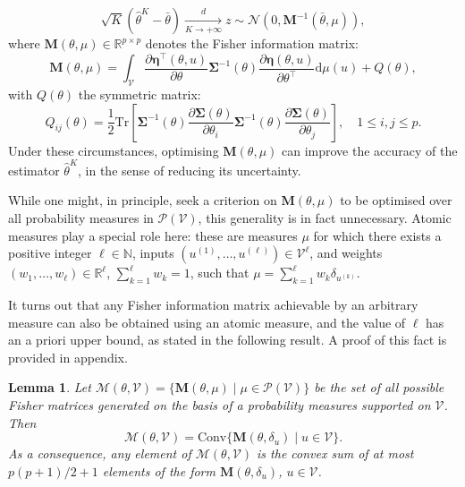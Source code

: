 \documentclass[twocolumn]{autart}
\newcommand{\B}[1]{{\textcolor{blue}{[bruno: \textit{#1}]}}}
\newtheorem{lemma}[theorem]{Lemma}
\theoremstyle{definition}
\theoremstyle{remark}
\newcommand{\R}{\mathbb{R}}
\newcommand{\N}{\mathbb{N}}
\newcommand{\diff}{\mathrm{d}}
\newcommand{\Conv}{\mathrm{Conv}}
\newcommand{\Tr}{\mathrm{Tr}}
\newcommand{\V}{\mathcal{V}}
\renewcommand{\P}{\mathcal{P}}
\newcommand{\Jb}{\mathbf{J}}
\newcommand{\Mb}{\mathbf{M}}
\newcommand{\etab}{\boldsymbol{\eta}}
\newcommand{\Sigmab}{\boldsymbol{\Sigma}}
\begin{document}
\begin{equation}\label{E:TCL}
\sqrt{K} (\widehat\theta^K-\bar\theta) \xrightarrow[K\to +\infty]{d} z \sim \mathcal{N}\left(0,\Mb^{-1}(\bar\theta,\mu)\right),
\end{equation}
where $\Mb(\theta,\mu)\in \R^{p\times p}$ denotes the Fisher information matrix:
\begin{equation}\label{E:defM}
\Mb(\theta,\mu) = 
\int_\V \frac{\partial\etab^\top(\theta,u)}{\partial\theta}
\Sigmab^{-1}(\theta) \frac{\partial\etab(\theta,u)}{\partial\theta^\top}  \diff \mu(u)+Q(\theta),
\end{equation}
with $Q(\theta)$ the symmetric matrix:
\begin{equation}\label{E:defQ}
Q_{ij}(\theta) = \frac{1}{2} \Tr\left[\Sigmab^{-1}(\theta)\frac{\partial\Sigmab(\theta)}{\partial\theta_i}\Sigmab^{-1}(\theta)\frac{\partial\Sigmab(\theta)}{\partial\theta_j}\right], \quad 1\leq i,j\leq p.
\end{equation}
Under these circumstances, optimising $\Mb(\theta,\mu)$ can improve the accuracy of the estimator $\widehat\theta^K$, in the sense of reducing its uncertainty.

While one might, in principle, seek a criterion on $\Mb(\theta,\mu)$ to be optimised over all probability measures in $\P(\V)$, this generality is in fact unnecessary.
Atomic measures play a special role here: these are measures $\mu$ for which
there exists a positive integer $\ell \in \N$, inputs $(u^{(1)},\dots, u^{(\ell)})\in \V^{\ell}$, and weights $(w_1,\dots,w_{\ell})\in\R^{\ell}$, $\sum_{k=1}^{\ell} w_k =1$, such that  $\mu=\sum_{k=1}^{\ell} w_k \delta_{u^{(k)}}$.

It turns out that any Fisher information matrix achievable by an arbitrary measure can also be obtained using an atomic measure, and the value of $\ell$ has an a priori upper bound,  as stated in the following result. A proof of this fact is provided in appendix.
\begin{lemma}\label{L:conv}
Let $\mathcal{M}(\theta, \V)=\{\Mb(\theta,\mu)\mid \mu \in \P(\V)\}$ be the set of all possible Fisher matrices generated on the basis of a probability measures supported on $\V$.
Then
$$
\mathcal{M}(\theta, \V) = \Conv\{\Mb(\theta,\delta_u)\mid u\in \V\}.
$$
As a consequence, any element of $\mathcal{M}(\theta, \V)$ is the convex sum of at most $p(p+1)/2+1$ elements of the form $\Mb(\theta,\delta_u)$, $u\in \V$.
\end{lemma}
\end{document}
